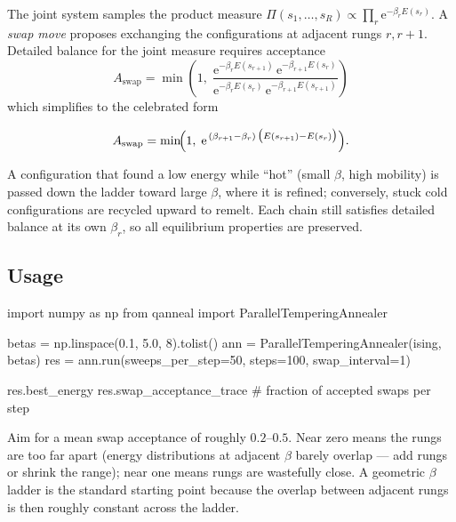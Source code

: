 The joint system samples the product measure
$\Pi(s_1,\dots,s_R)\propto\prod_r \mathrm{e}^{-\beta_r E(s_r)}$.
A \emph{swap move} proposes exchanging the configurations at adjacent rungs
$r,r{+}1$. Detailed balance for the joint measure requires acceptance
\begin{equation}
A_{\text{swap}}
=\min\!\left(1,\;
\frac{\mathrm{e}^{-\beta_r E(s_{r+1})}\,\mathrm{e}^{-\beta_{r+1}E(s_r)}}
     {\mathrm{e}^{-\beta_r E(s_r)}\,\mathrm{e}^{-\beta_{r+1}E(s_{r+1})}}
\right)
\end{equation}
which simplifies to the celebrated form

\begin{keyeq}
\begin{equation}
A_{\text{swap}}=\min\!\Bigl(1,\;
\mathrm{e}^{\,(\beta_{r+1}-\beta_r)\,\bigl(E(s_{r+1})-E(s_r)\bigr)}\Bigr).
\label{eq:pt-swap}
\end{equation}
\end{keyeq}

A configuration that found a low energy while ``hot'' (small $\beta$, high
mobility) is passed down the ladder toward large $\beta$, where it is
refined; conversely, stuck cold configurations are recycled upward to remelt.
Each chain still satisfies detailed balance at its own $\beta_r$, so all
equilibrium properties are preserved.

\subsection{Usage}

\begin{pycode}
import numpy as np
from qanneal import ParallelTemperingAnnealer

betas = np.linspace(0.1, 5.0, 8).tolist()
ann   = ParallelTemperingAnnealer(ising, betas)
res   = ann.run(sweeps_per_step=50, steps=100, swap_interval=1)

res.best_energy
res.swap_acceptance_trace   # fraction of accepted swaps per step
\end{pycode}

\begin{notebox}
Aim for a mean swap acceptance of roughly $0.2$--$0.5$. Near zero means the
rungs are too far apart (energy distributions at adjacent $\beta$ barely
overlap --- add rungs or shrink the range); near one means rungs are wastefully
close. A geometric $\beta$ ladder is the standard starting point because the
overlap between adjacent rungs is then roughly constant across the ladder.
\end{notebox}

